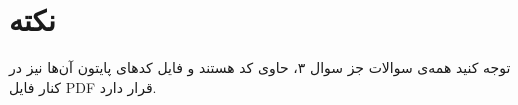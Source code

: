 \section*{نکته}

توجه کنید همه‌ی سوالات جز سوال ۳، حاوی کد هستند و فایل کدهای پایتون آن‌ها نیز در کنار فایل PDF قرار دارد.